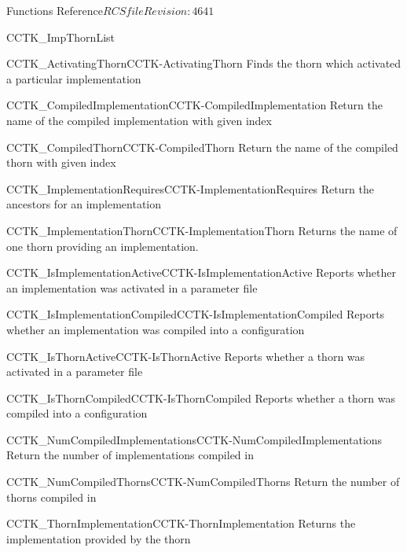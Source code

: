 \begin{cactuspart}{ Functions Reference}{$RCSfile$}{$Revision: 4641 $}
\begin{FunctionDescription}{CCTK\_ImpThornList}
\begin{SeeAlsoSection}
\begin{SeeAlso2}{CCTK\_ActivatingThorn}{CCTK-ActivatingThorn}
  Finds the thorn which activated a particular implementation
\end{SeeAlso2}
\begin{SeeAlso2}{CCTK\_CompiledImplementation}{CCTK-CompiledImplementation}
  Return the name of the compiled implementation with given index
\end{SeeAlso2}
\begin{SeeAlso2}{CCTK\_CompiledThorn}{CCTK-CompiledThorn}
  Return the name of the compiled thorn with given index
\end{SeeAlso2}
\begin{SeeAlso2}{CCTK\_ImplementationRequires}{CCTK-ImplementationRequires}
  Return the ancestors for an implementation
\end{SeeAlso2}
\begin{SeeAlso2}{CCTK\_ImplementationThorn}{CCTK-ImplementationThorn}
  Returns the name of one thorn providing an implementation.
\end{SeeAlso2}
\begin{SeeAlso2}{CCTK\_IsImplementationActive}{CCTK-IsImplementationActive}
  Reports whether an implementation was activated in a parameter file
\end{SeeAlso2}
\begin{SeeAlso2}{CCTK\_IsImplementationCompiled}{CCTK-IsImplementationCompiled}
  Reports whether an implementation was compiled into a configuration
\end{SeeAlso2}
\begin{SeeAlso2}{CCTK\_IsThornActive}{CCTK-IsThornActive}
  Reports whether a thorn was activated in a parameter file
\end{SeeAlso2}
\begin{SeeAlso2}{CCTK\_IsThornCompiled}{CCTK-IsThornCompiled}
  Reports whether a thorn was compiled into a configuration
\end{SeeAlso2}
\begin{SeeAlso2}{CCTK\_NumCompiledImplementations}{CCTK-NumCompiledImplementations}
  Return the number of implementations compiled in
\end{SeeAlso2}
\begin{SeeAlso2}{CCTK\_NumCompiledThorns}{CCTK-NumCompiledThorns}
  Return the number of thorns compiled in
\end{SeeAlso2}
\begin{SeeAlso2}{CCTK\_ThornImplementation}{CCTK-ThornImplementation}
  Returns the implementation provided by the thorn
\end{SeeAlso2}
\end{SeeAlsoSection}


\end{FunctionDescription}
\end{cactuspart}
